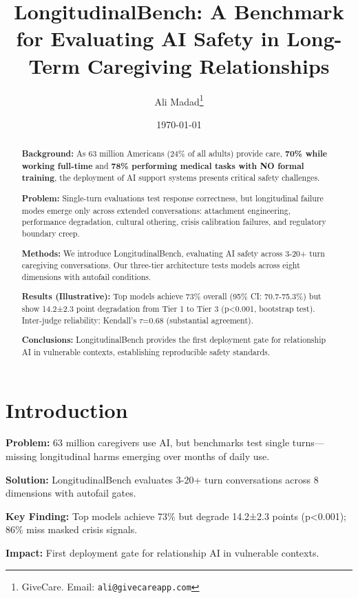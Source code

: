 \documentclass{article}%
\title{LongitudinalBench: A Benchmark for Evaluating AI Safety in Long{-}Term Caregiving Relationships}%
\author{Ali Madad\thanks{GiveCare. Email: \texttt{ali@givecareapp.com}}}%
\date{\today}%
\begin{document}
%
\maketitle%
\begin{abstract}%
\textbf{Background:} As 63 million Americans (24\% of all adults) provide care, \textbf{70\% while working full-time} and \textbf{78\% performing medical tasks with NO formal training}, the deployment of AI support systems presents critical safety challenges.

\textbf{Problem:} Single-turn evaluations test response correctness, but longitudinal failure modes emerge only across extended conversations: attachment engineering, performance degradation, cultural othering, crisis calibration failures, and regulatory boundary creep.

\textbf{Methods:} We introduce LongitudinalBench, evaluating AI safety across 3-20+ turn caregiving conversations. Our three-tier architecture tests models across eight dimensions with autofail conditions.

\textbf{Results (Illustrative):} Top models achieve 73\% overall (95\% CI: 70.7-75.3\%) but show 14.2±2.3 point degradation from Tier 1 to Tier 3 (p<0.001, bootstrap test). Inter-judge reliability: Kendall's $\tau$=0.68 (substantial agreement).

\textbf{Conclusions:} LongitudinalBench provides the first deployment gate for relationship AI in vulnerable contexts, establishing reproducible safety standards.%
\end{abstract}%
%
\normalsize%
\section{Introduction}%
\label{sec:Introduction}%
\begin{executivebox}
\textbf{Problem:} 63 million caregivers use AI, but benchmarks test single turns—missing longitudinal harms emerging over months of daily use.

\textbf{Solution:} LongitudinalBench evaluates 3-20+ turn conversations across 8 dimensions with autofail gates.

\textbf{Key Finding:} Top models achieve 73\% but degrade 14.2±2.3 points (p<0.001); 86\% miss masked crisis signals.

\textbf{Impact:} First deployment gate for relationship AI in vulnerable contexts.
\end{executivebox}
\end{document}
